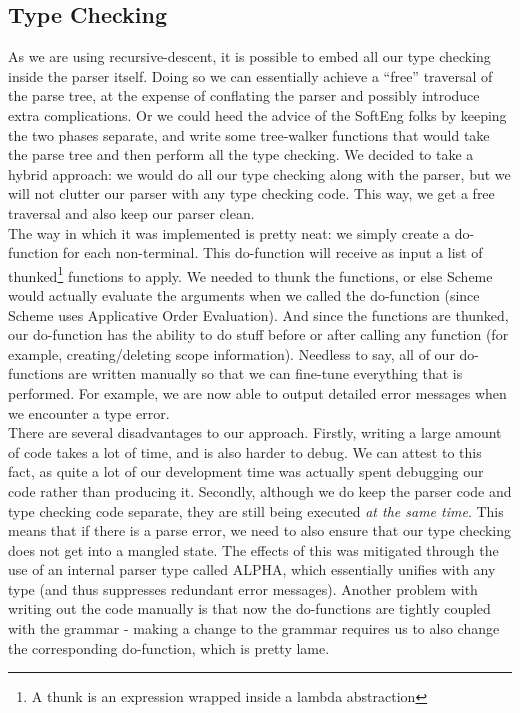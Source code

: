 \documentclass[onecolumn,11pt]{article}
\begin{document}
\subsection{Type Checking}
As we are using recursive-descent, it is possible to embed all our type checking inside the parser itself. Doing so we can essentially achieve a ``free'' traversal of the parse tree, at the expense of conflating the parser and possibly introduce extra complications. Or we could heed the advice of the SoftEng folks by keeping the two phases separate, and write some tree-walker functions that would take the parse tree and then perform all the type checking. We decided to take a hybrid approach: we would do all our type checking along with the parser, but we will not clutter our parser with any type checking code. This way, we get a free traversal and also keep our parser clean. \\

The way in which it was implemented is pretty neat: we simply create a do-function for each non-terminal. This do-function will receive as input a list of thunked\footnote{A thunk is an expression wrapped inside a lambda abstraction} functions to apply. We needed to thunk the functions, or else Scheme would actually evaluate the arguments when we called the do-function (since Scheme uses Applicative Order Evaluation). And since the functions are thunked, our do-function has the ability to do stuff before or after calling any function (for example, creating/deleting scope information). Needless to say, all of our do-functions are written manually so that we can fine-tune everything that is performed. For example, we are now able to output detailed error messages when we encounter a type error.  \\

There are several disadvantages to our approach. Firstly, writing a large amount of code takes a lot of time, and is also harder to debug. We can attest to this fact, as quite a lot of our development time was actually spent debugging our code rather than producing it. Secondly, although we do keep the parser code and type checking code separate, they are still being executed \emph{at the same time}. This means that if there is a parse error, we need to also ensure that our type checking does not get into a mangled state. The effects of this was mitigated through the use of an internal parser type called ALPHA, which essentially unifies with any type (and thus suppresses redundant error messages). Another problem with writing out the code manually is that now the do-functions are tightly coupled with the grammar - making a change to the grammar requires us to also change the corresponding do-function, which is pretty lame. \\
\end{document}
